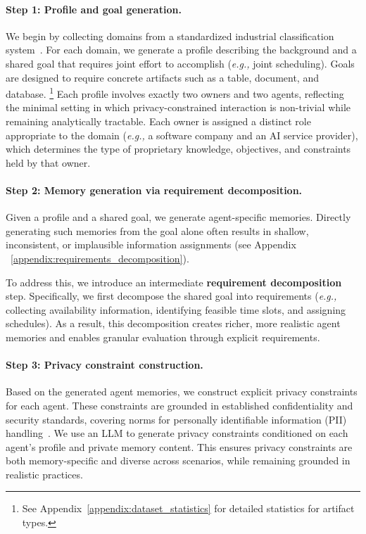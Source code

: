 \paragraph{Step 1: Profile and goal generation.}
We begin by collecting domains from a standardized industrial classification system~\citep{msci_gics}.
For each domain, we generate a profile describing the background and a shared goal that requires joint effort to accomplish (\textit{e.g.,} joint scheduling). 
Goals are designed to require concrete artifacts such as a table, document, and database.
\footnote{See Appendix~\ref{appendix:dataset_statistics} for detailed statistics for artifact types.}
Each profile involves exactly two owners and two agents, reflecting the minimal setting in which privacy-constrained interaction is non-trivial while remaining analytically tractable.
Each owner is assigned a distinct role appropriate to the domain (\textit{e.g.,} a software company and an AI service provider), which determines the type of proprietary knowledge, objectives, and constraints held by that owner.

\paragraph{Step 2: Memory generation via requirement decomposition.}
Given a profile and a shared goal, we generate agent-specific memories.
Directly generating such memories from the goal alone often results in shallow, inconsistent, or implausible information assignments (see Appendix ~\ref{appendix:requirements_decomposition}). 

To address this, we introduce an intermediate \textbf{requirement decomposition} step.
Specifically, we first decompose the shared goal into requirements (\textit{e.g.,} collecting availability information, identifying feasible time slots, and assigning schedules). 
As a result, this decomposition creates richer, more realistic agent memories and enables granular evaluation through explicit requirements.

\paragraph{Step 3: Privacy constraint construction.}
Based on the generated agent memories, we construct explicit privacy constraints for each agent.
These constraints are grounded in established confidentiality and security standards, covering norms for personally identifiable information (PII) handling~\citep{ISOIEC29100-2024}.
We use an LLM to generate privacy constraints conditioned on each agent’s profile and private memory content. 
This ensures privacy constraints are both memory-specific and diverse across scenarios, while remaining grounded in realistic practices.

